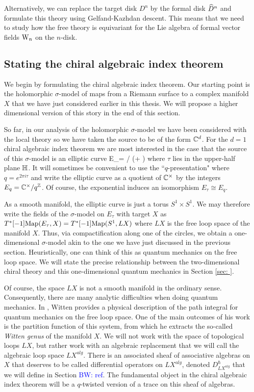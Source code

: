\documentclass[10pt]{amsart}
\def\brian{\textcolor{blue}{BW: }\textcolor{blue}}
\begin{document}
Alternatively, we can replace the target disk $D^n$ by the formal disk $\widehat{D}^n$ and formulate this theory using Gelfand-Kazhdan descent. 
This means that we need to study how the free theory is equivariant for the Lie algebra of formal vector fields ${{\rm W}_n}$ on the $n$-disk. 

\subsection{Stating the chiral algebraic index theorem}

We begin by formulating the chiral algebraic index theorem. 
Our starting point is the holomorphic $\sigma$-model of maps from a Riemann surface to a complex manifold $X$ that we have just considered earlier in this thesis. 
We will propose a higher dimensional version of this story in the end of this section. 

So far, in our analysis of the holomorphic $\sigma$-model we have been considered with the local theory so we have taken the source to be of the form $\mathbb C^d$. 
For the $d=1$ chiral algebraic index theorem we are most interested in the case that the source of this $\sigma$-model is an elliptic curve 
\ben
E_\tau = \CC / (\ZZ + \tau \ZZ)
\een
where $\tau$ lies in the upper-half plane $\mathbb H$. 
It will sometimes be convenient to use the ``$q$-presentation" where $q = e^{2 \pi i \tau}$ and write the elliptic curve as a quotient of $\mathbb C^\times$ by the integers $E_q = \mathbb C^\times / q^\mathbb Z$.
Of course, the exponential induces an isomorphism $E_\tau \cong E_q$. 

As a smooth manifold, the elliptic curve is just a torus $S^1 \times S^1$. 
We may therefore write the fields of the $\sigma$-model on $E_\tau$ with target $X$ as $T^*[-1]{\rm Map}(E_\tau, X) = T^*[-1] {\rm Map}(S^1, L X)$ where $LX$ is the free loop space of the manifold $X$.
Thus, via compactification along one of the circles, we obtain a one-dimensional $\sigma$-model akin to the one we have just discussed in the previous section. 
Heuristically, one can think of this as quantum mechanics on the free loop space. 
We will state the precise relationship between the two-dimensional chiral theory and this one-dimensional quantum mechanics in Section \ref{sec: }.

Of course, the space $LX$ is not a smooth manifold in the ordinary sense.
Consequently, there are many analytic difficulties when doing quantum mechanics. 
In \cite{WittenDirac}, Witten provides a physical description of the path integral for quantum mechanics on the free loop space.
One of the main outcomes of his work is the partition function of this system, from which he extracts the so-called {\em Witten genus} of the manifold $X$.
We will not work with the space of topological loops $LX$, but rather work with an algebraic replacement that we will call the algebraic loop space $LX^{alg}$.
There is an associated sheaf of associative algebras on $X$ that deserves to be called differential operators on $LX^{alg}$, denoted $D^{\hbar}_{LX^{alg}}$ that we will define in Section \brian{ref}. 
The fundamental object in the chiral algebraic index theorem will be a $q$-twisted version of a trace on this sheaf of algebras. 
\end{document}
